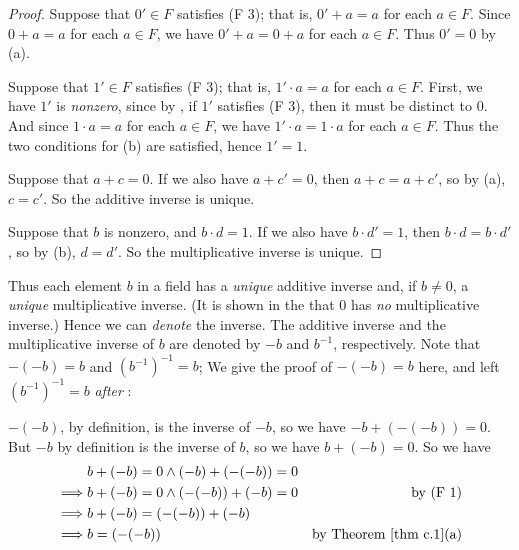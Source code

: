 \begin{proof}
Suppose that \(0' \in F\) satisfies (F 3); that is, \(0' + a = a\) for each \(a \in F\).
Since \(0 + a = a\) for each \(a \in F\), we have \(0' + a = 0 + a\) for each \(a \in F\).
Thus \(0' = 0\) by (a).

Suppose that \(1' \in F\) satisfies (F 3); that is, \(1' \cdot a = a\) for each \(a \in F\).
First, we have \(1'\) is \emph{nonzero}, since by , if \(1'\) satisfies (F 3), then it must be distinct to \(0\).
And since \(1 \cdot a = a\) for each \(a \in F\), we have \(1' \cdot a = 1 \cdot a\) for each \(a \in F\).
Thus the two conditions for (b) are satisfied, hence \(1' = 1\).

Suppose that \(a + c = 0\).
If we also have \(a + c' = 0\), then \(a + c = a + c'\), so by (a), \(c = c'\).
So the additive inverse is unique.

Suppose that \(b\) is nonzero, and \(b \cdot d = 1\).
If we also have \(b \cdot d' = 1\), then \(b \cdot d = b \cdot d'\), so by (b), \(d = d'\).
So the multiplicative inverse is unique.
\end{proof}

\begin{remark} \label{remark c.1}
Thus each element \(b\) in a field has a \emph{unique} additive inverse and, if \(b \ne 0\), a \emph{unique} multiplicative inverse.
(It is shown in the  that \(0\) has \emph{no} multiplicative inverse.)
Hence we can \emph{denote} the inverse.
The additive inverse and the multiplicative inverse of \(b\) are denoted by \(-b\) and \(b^{-1}\), respectively.
Note that \(-(-b)= b\) and \((b^{-1})^{-1} = b\);
We give the proof of \(-(-b) = b\) here, and left \((b^{-1})^{-1} = b\) \emph{after }:

\(-(-b)\), by definition, is the inverse of \(-b\), so we have \(-b + (-(-b)) = 0\).
But \(-b\) by definition is the inverse of \(b\), so we have \(b + (-b) = 0\).
So we have
\begin{align*}
             & b + (-b) = 0 \land (-b) + (-(-b)) = 0 \\
    \implies & b + (-b) = 0 \land (-(-b)) + (-b) = 0 & \text{by (F 1)} \\
    \implies & b + (-b) = (-(-b)) + (-b) \\
    \implies & b = (-(-b)) & \text{by \THM{c.1}(a)}
\end{align*}
\end{remark}

